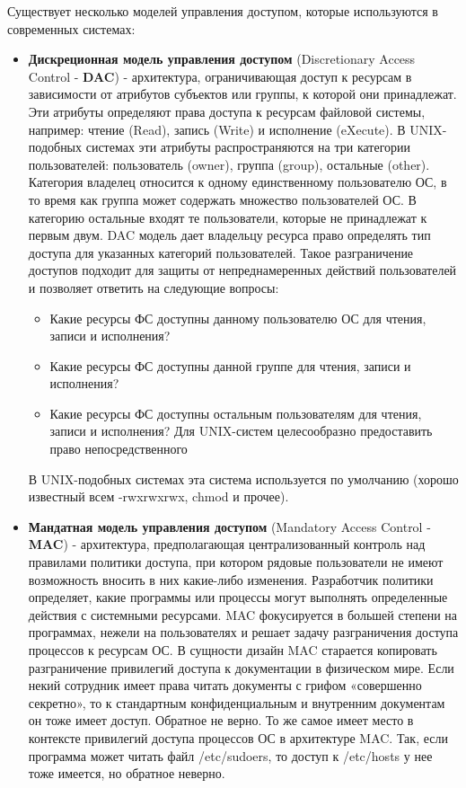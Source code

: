 Существует несколько моделей управления доступом, которые используются в современных системах:
\begin{itemize}
    \item \textbf{Дискреционная модель управления доступом} (Discretionary Access Control - \textbf{DAC}) -
        архитектура, ограничивающая доступ к  ресурсам в зависимости от атрибутов субъектов или
        группы, к которой они принадлежат. Эти атрибуты определяют права доступа к ресурсам
        файловой системы, например: чтение (Read), запись (Write) и исполнение (eXecute).
        В UNIX-подобных системах эти атрибуты распространяются на три категории пользователей:
        пользователь (owner), группа (group), остальные (other). Категория владелец относится
        к одному единственному пользователю ОС, в то время как группа может содержать множество
        пользователей ОС. В категорию остальные входят те пользователи, которые не принадлежат
        к первым двум.
        DAC модель дает владельцу ресурса право определять тип доступа для указанных категорий
        пользователей. Такое разграничение доступов подходит для защиты от непреднамеренных
        действий пользователей и позволяет ответить на следующие вопросы:
        \begin{itemize}
            \item Какие ресурсы ФС доступны данному пользователю ОС для чтения, записи и исполнения?
            \item Какие ресурсы ФС доступны данной группе для чтения, записи и исполнения?
            \item Какие ресурсы ФС доступны остальным пользователям для чтения, записи и исполнения?
                Для UNIX-систем целесообразно предоставить право непосредственного
        \end{itemize}
        В UNIX-подобных системах эта система используется по умолчанию (хорошо известный всем
        -rwxrwxrwx, chmod и прочее).
    \item \textbf{Мандатная модель управления доступом} (Mandatory Access Control - \textbf{MAC}) -
        архитектура, предполагающая централизованный контроль
        над правилами политики доступа, при котором рядовые пользователи не имеют возможность
        вносить в них какие-либо изменения. Разработчик политики определяет, какие программы или
        процессы могут выполнять определенные действия с системными ресурсами. MAC фокусируется в
        большей степени на программах, нежели на пользователях и решает задачу разграничения
        доступа процессов к ресурсам ОС.
        В сущности дизайн MAC старается копировать разграничение привилегий доступа к документации
        в физическом мире. Если некий сотрудник имеет права читать документы с грифом
        «совершенно секретно», то к стандартным конфиденциальным и внутренним документам
        он тоже имеет доступ. Обратное  не верно. То же самое имеет место в контексте привилегий
        доступа процессов ОС в архитектуре MAC. Так, если программа может читать файл /etc/sudoers,
        то доступ к /etc/hosts у нее тоже имеется, но обратное неверно.
\end{itemize}

